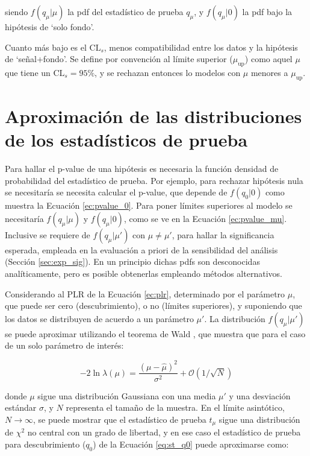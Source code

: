 \noindent
siendo $f(q_\mu|\mu)$ la pdf del estadístico de prueba $q_\mu$, y $f(q_\mu|0)$ la pdf bajo la hipótesis de `solo fondo'.

Cuanto más bajo es el $\text{CL}_{s}$, menos compatibilidad entre los datos y la hipótesis de `señal+fondo'. Se define por convención al límite superior ($\mu_{\text{up}}$) como aquel $\mu$ que tiene un $\text{CL}_{s}=95\%$, y se rechazan entonces lo modelos con $\mu$ menores a $\mu_{\text{up}}$.




\section{Aproximación de las distribuciones de los estadísticos de prueba}

Para hallar el p-value de una hipótesis es necesaria la función densidad de probabilidad del estadístico de prueba. Por ejemplo, para rechazar hipótesis nula se necesitaría se necesita calcular el p-value, que depende de $f(q_{0}|0)$ como muestra la Ecuación \ref{ec:pvalue_0}. Para poner límites superiores al modelo se necesitaría $f(q_{\mu}|\mu)$ y $f(q_{\mu}|0)$, como se ve en la Ecuación \ref{ec:pvalue_mu}. Inclusive se requiere de $f(q_{\mu}|\mu')$ con $\mu\neq\mu'$, para hallar la significancia esperada, empleada en la evaluación a priori de la sensibilidad del análisis (Sección \ref{sec:exp_sig}). En un principio dichas pdfs son desconocidas analíticamente, pero es posible obtenerlas empleando métodos alternativos.

Considerando al PLR de la Ecuación \ref{ec:plr}, determinado por el parámetro $\mu$, que puede ser cero (descubrimiento), o no (límites superiores), y suponiendo que los datos se distribuyen de acuerdo a un parámetro $\mu'$. La distribución $f(q_{\mu}|\mu')$ se puede aproximar utilizando el teorema de Wald \cite{10.2307/1990256}, que muestra que para el caso de un solo parámetro de interés:

\begin{equation}
	-2\ln{\lambda(\mu)}=\frac{(\mu-\hat{\mu})^{2}}{\sigma^{2}}+\mathcal{O}(1/\sqrt{N})
\end{equation}

\noindent
donde $\mu$ sigue una distribución Gaussiana con una media $\mu'$ y una desviación estándar $\sigma$, y $N$ representa el tamaño de la muestra. 
En el límite asintótico, $N\to\infty$, se puede mostrar que el estadístico de prueba $t_{\mu}$ sigue una distribución de $\chi^{2}$ no central con un grado de libertad, y en ese caso el estadístico de prueba para descubrimiento ($q_{0}$) de la Ecuación \ref{eq:st_q0} puede aproximarse como:

